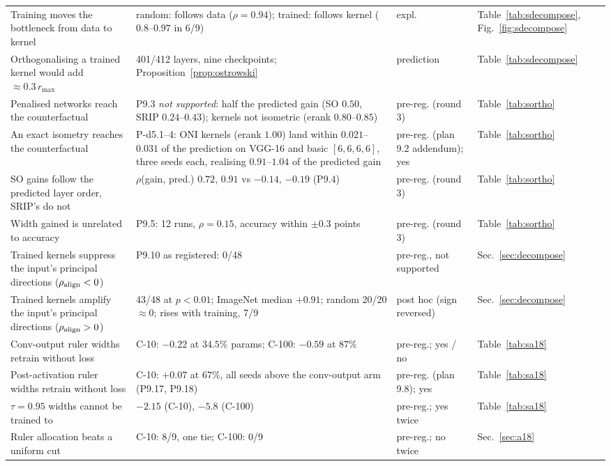 \documentclass[10pt,journal,compsoc]{IEEEtran}
\begin{document}
\begin{table}[t]
\begin{tabular}{p{4.3cm}p{5.9cm}lp{2.5cm}}
  Training moves the bottleneck from data to kernel & random: follows data ($\rho = 0.94$); trained: follows kernel ($0.8$--$0.97$ in 6/9) & expl. & Table~\ref{tab:sdecompose}, Fig.~\ref{fig:sdecompose} \\
  Orthogonalising a trained kernel would add $\approx 0.3\,r_{\max}$ & 401/412 layers, nine checkpoints; Proposition~\ref{prop:ostrowski} & prediction & Table~\ref{tab:sdecompose} \\
  Penalised networks reach the counterfactual & P9.3 \emph{not supported}: half the predicted gain (SO $0.50$, SRIP $0.24$--$0.43$); kernels not isometric (erank $0.80$--$0.85$) & pre-reg. (round 3) & Table~\ref{tab:sortho} \\
  An exact isometry reaches the counterfactual & P-d5.1--4: ONI kernels (erank $1.00$) land within $0.021$--$0.031$ of the prediction on VGG-16 and basic $[6,6,6,6]$, three seeds each, realising $0.91$--$1.04$ of the predicted gain & pre-reg. (plan 9.2 addendum); yes & Table~\ref{tab:sortho} \\
  SO gains follow the predicted layer order, SRIP's do not & $\rho$(gain, pred.) $0.72$, $0.91$ vs $-0.14$, $-0.19$ (P9.4) & pre-reg. (round 3) & Table~\ref{tab:sortho} \\
  Width gained is unrelated to accuracy & P9.5: 12 runs, $\rho = 0.15$, accuracy within $\pm 0.3$ points & pre-reg. (round 3) & Table~\ref{tab:sortho} \\
  Trained kernels suppress the input's principal directions ($\rho_{\rm align} < 0$) & P9.10 as registered: 0/48 & pre-reg., not supported & Sec.~\ref{sec:decompose} \\
  Trained kernels amplify the input's principal directions ($\rho_{\rm align} > 0$) & 43/48 at $p < 0.01$; ImageNet median $+0.91$; random 20/20 $\approx 0$; rises with training, 7/9 & post hoc (sign reversed) & Sec.~\ref{sec:decompose} \\
  Conv-output ruler widths retrain without loss & C-10: $-0.22$ at $34.5\%$ params; C-100: $-0.59$ at $87\%$ & pre-reg.; yes / no & Table~\ref{tab:sa18} \\
  Post-activation ruler widths retrain without loss & C-10: $+0.07$ at $67\%$, all seeds above the conv-output arm (P9.17, P9.18) & pre-reg. (plan 9.8); yes & Table~\ref{tab:sa18} \\
  $\tau = 0.95$ widths cannot be trained to & $-2.15$ (C-10), $-5.8$ (C-100) & pre-reg.; yes twice & Table~\ref{tab:sa18} \\
  Ruler allocation beats a uniform cut & C-10: 8/9, one tie; C-100: 0/9 & pre-reg.; no twice & Sec.~\ref{sec:a18} \\

\end{tabular}
\end{table}
\end{document}
